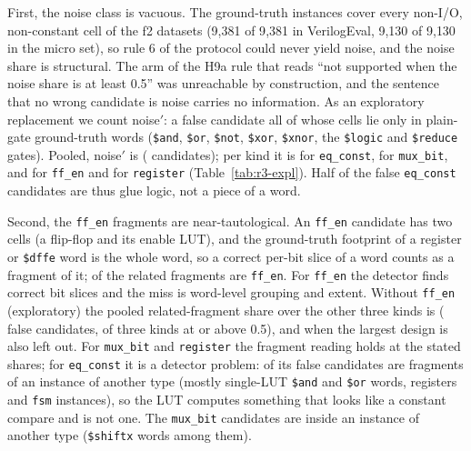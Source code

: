 \documentclass[conference]{IEEEtran}
\newcommand{\code}[1]{\texttt{#1}}
\begin{document}
First, the noise class is vacuous. The ground-truth instances cover every non-I/O, non-constant
cell of the f2 datasets (9{,}381 of 9{,}381 in VerilogEval, 9{,}130 of 9{,}130 in the micro set), so
rule 6 of the protocol could never yield noise, and the noise share \rttNinePoolNoise{} is
structural. The arm of the H9a rule that reads ``not supported when the noise share is at least
0.5'' was unreachable by construction, and the sentence that no wrong candidate is noise carries
no information. As an exploratory replacement we count noise$'$: a false candidate all of whose
cells lie only in plain-gate ground-truth words (\code{\$and}, \code{\$or}, \code{\$not},
\code{\$xor}, \code{\$xnor}, the \code{\$logic} and \code{\$reduce} gates). Pooled, noise$'$ is
\rttNineNoisePrime{} (\rttNineNoisePrimeN{} candidates); per kind it is \rttNineEqconstNoisePrime{} for
\code{eq\_const}, \rttNineMuxbitNoisePrime{} for \code{mux\_bit}, and \rttNineFfenNoisePrime{} for
\code{ff\_en} and \rttNineRegisterNoisePrime{} for \code{register} (Table~\ref{tab:r3-expl}).
Half of the false \code{eq\_const} candidates are thus glue logic, not a piece of a word.

Second, the \code{ff\_en} fragments are near-tautological. An \code{ff\_en} candidate has two
cells (a flip-flop and its enable LUT), and the ground-truth footprint of a register or
\code{\$dffe} word is the whole word, so a correct per-bit slice of a word counts as a fragment
of it; \rttNineFfenFragN{} of the \rttNinePoolFragN{} related fragments are \code{ff\_en}. For
\code{ff\_en} the detector finds correct bit slices and the miss is word-level grouping and
extent. Without \code{ff\_en} (exploratory) the pooled related-fragment share over the other
three kinds is \rttNineNoFfenFrag{} (\rttNineNoFfenFalse{} false candidates, \rttNineNoFfenKindsOk{} of
three kinds at or above 0.5), and \rttNineNoFfenTopFrag{} when the largest design is also left out. For
\code{mux\_bit} and \code{register} the fragment reading holds at the stated shares; for
\code{eq\_const} it is a detector problem: \rttNineEqconstOther{} of its false candidates are
fragments of an instance of another type (mostly single-LUT \code{\$and} and \code{\$or} words,
registers and \code{fsm} instances), so the LUT computes something that looks like a constant
compare and is not one. The \code{mux\_bit} candidates are \rttNineMuxbitOther{} inside an
instance of another type (\code{\$shiftx} words among them).
\end{document}
